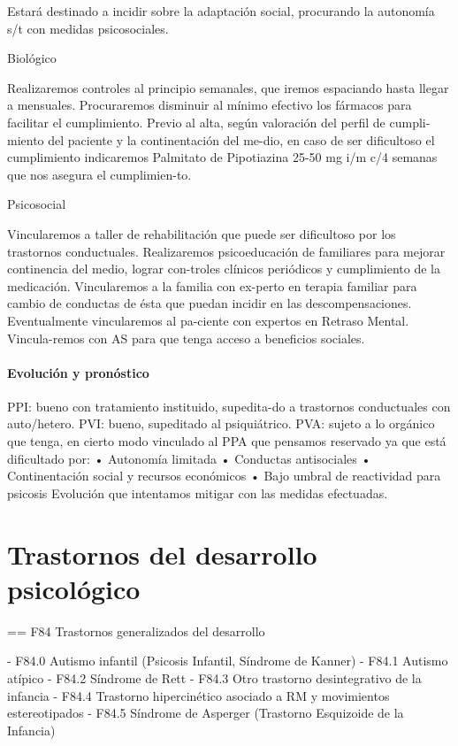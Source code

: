 \documentclass{scrbook}
\begin{document}
Estará destinado a incidir sobre la adaptación social, procurando la autonomía s/t con medidas psicosociales.

Biológico

Realizaremos controles al principio semanales, que iremos espaciando hasta llegar a mensuales. Procuraremos disminuir al mínimo efectivo los fármacos para facilitar el cumplimiento. Previo al alta, según valoración del perfil de cumpli-miento del paciente y la continentación del me-dio, en caso de ser dificultoso el cumplimiento indicaremos Palmitato de Pipotiazina 25-50 mg i/m c/4 semanas que nos asegura el cumplimien-to.

Psicosocial

Vincularemos a taller de rehabilitación que puede ser dificultoso por los trastornos conductuales. Realizaremos psicoeducación de familiares para mejorar continencia del medio, lograr con-troles clínicos periódicos y cumplimiento de la medicación. Vincularemos a la familia con ex-perto en terapia familiar para cambio de conductas de ésta que puedan incidir en las descompensaciones. Eventualmente vincularemos al pa-ciente con expertos en Retraso Mental. Vincula-remos con AS para que tenga acceso a beneficios sociales.

\subsection*{Evolución y pronóstico}
PPI: bueno con tratamiento instituido, supedita-do a trastornos conductuales con auto/hetero. PVI: bueno, supeditado al psiquiátrico. PVA: sujeto a lo orgánico que tenga, en cierto modo vinculado al PPA que pensamos reservado ya que está dificultado por: • Autonomía limitada • Conductas antisociales • Continentación social y recursos económicos • Bajo umbral de reactividad para psicosis Evolución que intentamos mitigar con las medidas efectuadas.

\part{Trastornos del desarrollo psicológico}
== F84 Trastornos generalizados del desarrollo

- F84.0 Autismo infantil (Psicosis Infantil, Síndrome de Kanner)
- F84.1 Autismo atípico
- F84.2 Síndrome de Rett
- F84.3 Otro trastorno desintegrativo de la infancia
- F84.4 Trastorno hipercinético asociado a RM y movimientos estereotipados
- F84.5 Síndrome de Asperger (Trastorno Esquizoide de la Infancia)
\end{document}
